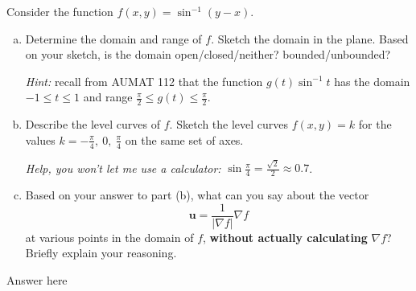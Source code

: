 \documentclass[12pt,a4paper]{article}
\begin{document}
    \begin{problem}
        Consider the function \(f(x,y) = \sin^{-1}(y-x)\).
        \begin{enumerate}[(a)]
            \item Determine the domain and range  of \(f\). Sketch the domain in the plane. Based on your sketch, is the domain open/closed/neither? bounded/unbounded?
            
            \emph{Hint:} recall from AUMAT 112  that the function \(g(t) \sin^{-1} t\) has the domain \(-1 \leq t \leq 1\) and range \(\frac{\pi}{2} \leq g(t) \leq \frac{\pi}{2}\).

            \item Describe the level curves of \(f\). Sketch the level curves \(f(x,y) = k\) for the values \(k = -\frac{\pi}{4}, \ 0, \ \frac{\pi}{4}\) on the same set of axes.
            
            \textit{Help, you won't let me use a calculator:} \(\sin{} \frac{\pi}{4} = \frac{\sqrt{2}}{2} \approx 0.7\).

            \item Based on your answer to part (b), what can you say about the vector \[\mathbf{u} = \frac{1}{\left| \nabla f \right|} \nabla f\] at various points in the domain of \(f\), \textbf{without actually calculating} \(\nabla f\)? Briefly explain your reasoning.
        \end{enumerate}
    \end{problem}
    \begin{answer}
        Answer here
    \end{answer}
\end{document}

